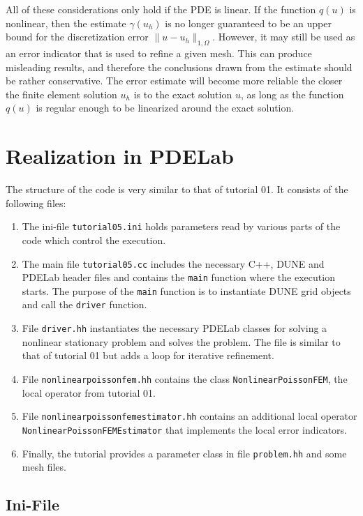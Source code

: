 \documentclass[a4paper,12pt]{article}
\begin{document}
All of these considerations only hold if the PDE is linear. If the function $q(u)$ is nonlinear,
then the estimate $\gamma(u_h)$ is no longer guaranteed to be an upper bound for the discretization
error $\|u-u_h\|_{1,\Omega}$. However, it may still be used as an error indicator that is used to
refine a given mesh. This can produce misleading results, and therefore the conclusions drawn from
the estimate should be rather conservative. The error estimate will become more reliable the closer
the finite element solution $u_h$ is to the exact solution $u$, as long as the function $q(u)$ is
regular enough to be linearized around the exact solution.

\section{Realization in PDELab}

The structure of the code is very similar to that of tutorial 01. It consists of the following
files:
\begin{enumerate}[1)]
\item The ini-file
\lstinline{tutorial05.ini} holds parameters read by various parts of the code
which control the execution.
\item The main file \lstinline{tutorial05.cc} includes the necessary C++,
DUNE and PDELab header files
and contains the \lstinline{main} function where the execution starts.
The purpose of the \lstinline{main} function is
to instantiate DUNE grid objects and call the \lstinline{driver} function.
\item File \lstinline{driver.hh} instantiates the necessary PDELab classes
for solving a nonlinear stationary problem and solves the problem. The file is similar
to that of tutorial 01 but adds a loop for iterative refinement.
\item File \lstinline{nonlinearpoissonfem.hh} contains the class
\lstinline{NonlinearPoissonFEM}, the local operator from tutorial 01.
\item File \lstinline{nonlinearpoissonfemestimator.hh} contains an additional local operator
  \lstinline{NonlinearPoissonFEMEstimator} that implements the local error indicators.
\item Finally, the tutorial provides a parameter class in file \lstinline{problem.hh}
and some mesh files.
\end{enumerate}

\subsection{Ini-File}
\end{document}

